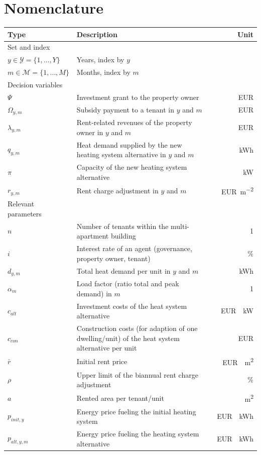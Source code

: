 \documentclass[review]{elsarticle}
\begin{document}
\section*{Nomenclature}
\begin{center}
	\renewcommand{\arraystretch}{1.1}
	\centering
	\small
	\begin{tabular}{lm{8cm}r}
		Type & Description & Unit\\
		\hline
		Set and index & & \\
		\hline
		
		{$y \in \mathcal{Y}=\{1,\ldots,Y\}$} & Years, index by $y$\\
		{$m \in \mathcal{M}=\{1,\ldots,M\}$} & Months, index by $m$\\
		\hline
		Decision variables\\
		\hline
		{$\Psi$} & Investment grant to the property owner & \SI{}{EUR}\\
		{$\Omega_{y,m}$} & Subsidy payment to a tenant in $y$ and $m$ & \SI{}{EUR}\\
		{$\lambda_{y,m}$} & Rent-related revenues of the property owner in $y$ and $m$ & \SI{}{EUR}\\
		{$q_{y,m}$} & Heat demand supplied by the new heating system alternative in $y$ and $m$& \SI{}{kWh}\\
		{$\pi$} & Capacity of the new heating system alternative & \SI{}{kW}\\
		{$r_{y,m}$} & Rent charge adjustment in $y$ and $m$ & \SI{}{EUR\per m^2}\\
		\hline
		Relevant parameters\\
		\hline
		{$n$} & Number of tenants within the multi-apartment building & \SI{}{1}\\
		{$i$} & Interest rate of an agent (governance, property owner, tenant)& \SI{}{\%}\\
		{$d_{y,m}$} & Total heat demand per unit in $y$ and $m$ & \SI{}{kWh}\\
		{$\alpha_{m}$} & Load factor (ratio total and peak demand) in $m$ & \SI{}{1}\\
		{$c_{alt}$} & Investment costs of the heat system alternative& \SI{}{EUR \per kW}\\
		{$c_{con}$} & Construction costs (for adaption of one dwelling/unit) of the heat system alternative per unit & \SI{}{EUR}\\
		{$\bar{r}$} & Initial rent price & \SI{}{EUR \per m^2}\\
		{$\rho$} & Upper limit of the biannual rent charge adjustment & \SI{}{\%}\\
		{$a$} & Rented area per tenant/unit & \SI{}{m^2}\\
		{$p_{init,y}$} & Energy price fueling the initial heating system & \SI{}{EUR \per kWh}\\
		{$p_{alt,y,m}$} & Energy price fueling the heating system alternative & \SI{}{EUR \per kWh}\\
		\hline
	\end{tabular}
\end{center}
\newpage
\end{document}
